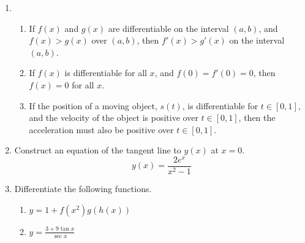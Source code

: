 \begin{enumerate}
    \item \TorF
    \begin{enumerate}
    	\item If $f(x)$ and $g(x)$ are differentiable on the interval $(a,b)$, and $f(x) > g(x)$ over $(a,b)$, then $f'(x) > g'(x)$ on the interval $(a,b)$. 
        \item If $f(x)$ is differentiable for all $x$, and $f(0) = f'(0) = 0$, then $f(x) = 0$ for all $x$. 
        \item If the position of a moving object, $s(t)$, is differentiable for $t\in[0,1]$, and the velocity of the object is positive over $t \in [0,1]$, then the acceleration must also be positive over $t\in[0,1]$. 
    \end{enumerate}    
    
    \item Construct an equation of the tangent line to $y(x)$ at $x= 0$. $$y(x) = \frac{2e^x}{x^2-1}$$
    
	\item Differentiate the following functions. 
    
    \begin{enumerate}
    	\item $y = 1 + f(x^2) g(h(x))$
        \item $y = \frac{3+9\tan x}{\sec x}$
    \end{enumerate}
    
\end{enumerate}